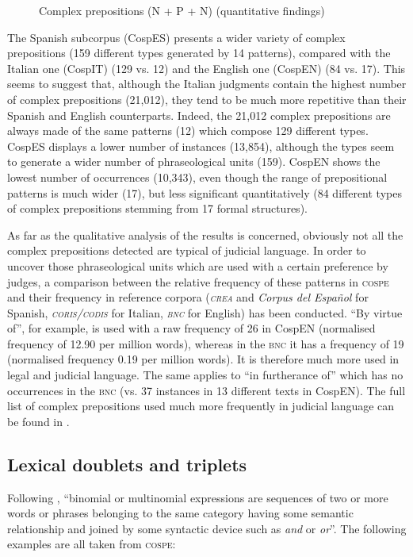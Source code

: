 \documentclass[output=paper]{LSP/langsci}
\begin{document}
\begin{figure}

\caption{Complex prepositions (N + P + N) (quantitative findings)} \label{fig:6:1}
\end{figure}

The Spanish subcorpus (CospES) presents a wider variety of complex prepositions (159 different types generated by 14 patterns), compared with the Italian one (CospIT) (129 vs. 12) and the English one (CospEN) (84 vs. 17). This seems to suggest that, although the Italian judgments contain the highest number of complex prepositions (21,012), they tend to be much more repetitive than their Spanish and English counterparts. Indeed, the 21,012 complex prepositions are always made of the same patterns (12) which compose 129 different types. CospES displays a lower number of instances (13,854), although the types seem to generate a wider number of phraseological units (159). CospEN shows the lowest number of occurrences (10,343), even though the range of prepositional patterns is much wider (17), but less significant quantitatively (84 different types of complex prepositions stemming from 17 formal structures).

As far as the qualitative analysis of the results is concerned, obviously not all the complex prepositions detected are typical of judicial language. In order to uncover those phraseological units which are used with a certain preference by judges, a comparison between the relative frequency of these patterns in \textsc{cospe} and their frequency in reference corpora (\textit{\textsc{crea}} and \textit{Corpus del Español} for Spanish, \textit{\textsc{coris}/\textsc{codis}} for Italian, \textit{\textsc{bnc}} for English) has been conducted. “By virtue of”, for example, is used with a raw frequency of 26 in CospEN (normalised frequency of 12.90 per million words), whereas in the \textsc{bnc} it has a frequency of 19 (normalised frequency 0.19 per million words). It is therefore much more used in legal and judicial language. The same applies to “in furtherance of” which has no occurrences in the \textsc{bnc} (vs. 37 instances in 13 different texts in CospEN). The full list of complex prepositions used much more frequently in judicial language can be found in \citet[200--205]{Pontrandolfo2013b}.

\subsection{Lexical doublets and triplets}
Following \citet[90]{Bhatia1984}, “binomial or multinomial expressions are sequences of two or more words or phrases belonging to the same category having some semantic relationship and joined by some syntactic device such as \textit{and} or \textit{or}”. The following examples are all taken from \textsc{cospe}:
\end{document}
